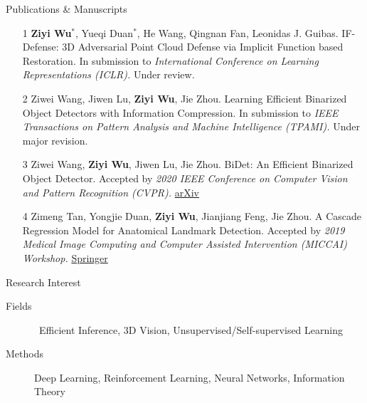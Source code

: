 \documentclass{resume} %
\begin{document}
\begin{rSection}{Publications \& Manuscripts}

\begin{enumerate}
\item[1] \textbf{Ziyi Wu}$^{*}$, Yueqi Duan$^{*}$, He Wang, Qingnan Fan, Leonidas J. Guibas. IF-Defense: 3D Adversarial Point Cloud Defense via Implicit Function based Restoration. In submission to \textit{International Conference on Learning Representations (ICLR).} Under review.
\item[2] Ziwei Wang, Jiwen Lu, \textbf{Ziyi Wu}, Jie Zhou. Learning Efficient Binarized Object Detectors with Information Compression. In submission to \textit{IEEE Transactions on Pattern Analysis and Machine Intelligence (TPAMI).} Under major revision.
\item[3] Ziwei Wang, \textbf{Ziyi Wu}, Jiwen Lu, Jie Zhou. BiDet: An Efficient Binarized Object Detector. Accepted by \textit{2020 IEEE Conference on Computer Vision and Pattern Recognition (CVPR).} \href{https://arxiv.org/abs/2003.03961}{arXiv}
\item[4] Zimeng Tan, Yongjie Duan, \textbf{Ziyi Wu}, Jianjiang Feng, Jie Zhou. A Cascade Regression Model for Anatomical Landmark Detection. Accepted by \textit{2019 Medical Image Computing and Computer Assisted Intervention (MICCAI) Workshop.} \href{https://link.springer.com/chapter/10.1007/978-3-030-39074-7_5}{Springer}
\end{enumerate}

\end{rSection}

\begin{rSection}{Research Interest}

\begin{description}
    \item[Fields] \quad\quad\, 
    Efficient Inference, 
    3D Vision, %
    Unsupervised/Self-supervised Learning
    \item[Methods] \quad Deep Learning, Reinforcement Learning, Neural Networks, Information Theory
    \newline
\end{description}

\end{rSection}
\end{document}
